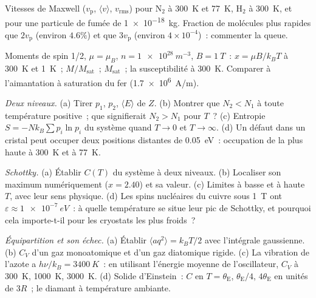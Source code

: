 \begin{exercise}[$\star$]\label{exo:b2:boltzmann-factor:3}
Vitesses de Maxwell ($v_{\text{p}}$, $\langle v\rangle$, $v_{\text{rms}}$) pour N$_2$
à \qty{300}{K} et \qty{77}{K}, H$_2$ à \qty{300}{K}, et pour une particule de fumée
de \qty{1e-18}{kg}. Fraction de molécules plus rapides que $2v_{\text{p}}$
(environ $4.6\%$) et que $3v_{\text{p}}$ (environ $4 \times 10^{-4}$)~: commenter
la queue.
\end{exercise}

\begin{exercise}[$\star$]\label{exo:b2:boltzmann-factor:4}
Moments de spin 1/2, $\mu = \mu_B$, $n = \qty{1e28}{m^{-3}}$, $B = \qty{1}{T}$~:
$x = \mu B/k_BT$ à \qty{300}{K} et \qty{1}{K}~; $M/M_{\text{sat}}$~; $M_{\text{sat}}$~;
la susceptibilité à \qty{300}{K}. Comparer à l'aimantation à saturation du
fer (\qty{1.7e6}{A/m}).
\end{exercise}

\begin{exercise}[$\star\star$]\label{exo:b2:boltzmann-factor:5}
\emph{Deux niveaux.} (a) Tirer $p_1$, $p_2$, $\langle E\rangle$ de $Z$. (b)
Montrer que $N_2 < N_1$ à toute température positive~; que signifierait $N_2 >
N_1$ pour $T$~? (c) Entropie $S = -Nk_B\sum p_i\ln p_i$ du système quand
$T \to 0$ et $T \to \infty$. (d) Un défaut dans un cristal peut occuper deux
positions distantes de \qty{0.05}{eV}~: occupation de la plus haute à
\qty{300}{K} et à \qty{77}{K}.
\end{exercise}

\begin{exercise}[$\star\star$]\label{exo:b2:boltzmann-factor:6}
\emph{Schottky.} (a) Établir $C(T)$ du système à deux niveaux. (b) Localiser
son maximum numériquement ($x = 2.40$) et sa valeur. (c) Limites à basse
et à haute $T$, avec leur sens physique. (d) Les spins nucléaires du cuivre
sous \qty{1}{T} ont $\varepsilon \approx \qty{1e-7}{eV}$~: à quelle température se situe
leur pic de Schottky, et pourquoi cela importe-t-il pour les cryostats les plus
froids~?
\end{exercise}

\begin{exercise}[$\star\star$]\label{exo:b2:boltzmann-factor:7}
\emph{Équipartition et son échec.} (a) Établir $\langle aq^2\rangle =
k_BT/2$ avec l'intégrale gaussienne. (b) $C_V$ d'un gaz monoatomique et d'un
gaz diatomique rigide. (c) La vibration de l'azote a $h\nu/k_B = \qty{3400}{K}$~:
en utilisant l'énergie moyenne de l'oscillateur, $C_V$ à \qty{300}{K}, \qty{1000}{K},
\qty{3000}{K}. (d) Solide d'Einstein~: $C$ en $T = \theta_{\text{E}}$, $\theta_{\text{E}}/4$,
$4\theta_{\text{E}}$ en unités de $3R$~; le diamant à température ambiante.
\end{exercise}

